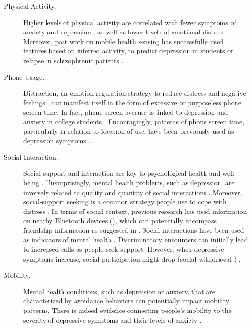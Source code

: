 \begin{description}
\item[Physical Activity.]     Higher levels of physical activity are correlated with fewer symptoms of anxiety and depression \citep{Stephens:1988}, as well as lower levels of emotional distress \citep{Steptoe:1996}. Moreover, past work on mobile health sensing has successfully used features based on inferred activity, \eg to predict depression in students \citep{Wang:2018} or relapse in schizophrenic patients \citep{Wang:2016}. 
\item[Phone Usage.] Distraction, an emotion-regulation strategy to reduce distress and negative feelings \citep{Sheppes:2011}, can manifest itself in the form of excessive or purposeless phone screen time. In fact, phone screen overuse is linked to depression and anxiety in college students \citep{Demirci:2015}. Encouragingly, patterns of phone screen time, particularly in relation to location of use, have been previously used as depression symptoms \citep{Wang:2018}. 
\item[Social Interaction.] Social support and interaction are key to psychological health and well-being \citep{Kawachi:2001}. Unsurprisingly, mental health problems, such as depression, are inversely related to quality and quantity of social interactions \citep{Nezlek:1994}. Moreover, social-support seeking is a common strategy people use to cope with distress \citep{Carver:1997}.  In terms of social context, previous research has used information on nearby Bluetooth devices (\eg \cite{wang2014studentlife}), which can potentially encompass friendship information as suggested in \citep{Eagle:2009}. Social interactions have been used as indicators of mental health \citep{Wang:2016}.  
Discriminatory encounters can initially lead to increased calls as people seek support. However, when depressive symptoms increase, social participation might drop (\eg social withdrawal \citep{Girard:2014}) . 
\item[Mobility.] Mental health conditions, such as depression or anxiety, that are characterized by avoidance behaviors can potentially impact mobility patterns.  There is indeed evidence connecting people's mobility to the severity of depressive symptoms \citep{Saeb:2015, Saeb:2016} and their levels of anxiety \citep{Huang:2016}. 

\end{description}
